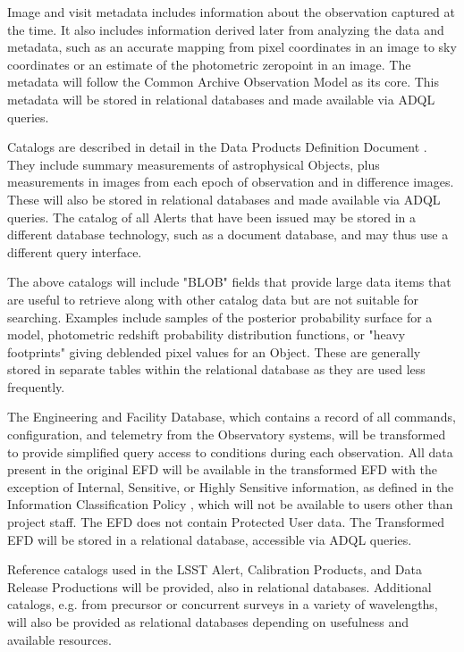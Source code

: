 Image and visit metadata includes information about the observation captured at
the time.  It also includes information derived later from analyzing the data
and metadata, such as an accurate mapping from pixel coordinates in an image to
sky coordinates or an estimate of the photometric zeropoint in an image.  The
metadata will follow the Common Archive Observation Model \citep{2012ASPC..461..339D,CAOM2} as its
core.  This metadata will be stored in relational databases and made available
via ADQL queries.

Catalogs are described in detail in the Data Products Definition Document
.  They include summary measurements of astrophysical Objects,
plus measurements in images from each epoch of observation and in difference
images.  These will also be stored in relational databases and made available
via ADQL queries.  The catalog of all Alerts that have been issued may be
stored in a different database technology, such as a document database, and
may thus use a different query interface.

The above catalogs will include "BLOB" fields that provide large data items
that are useful to retrieve along with other catalog data but are not
suitable for searching.  Examples include samples of the posterior probability
surface for a model, photometric redshift probability distribution functions,
or "heavy footprints" giving deblended pixel values for an Object.  These
are generally stored in separate tables within the relational database as
they are used less frequently.

The Engineering and Facility Database, which contains a record of all commands,
configuration, and telemetry from the Observatory systems, will be transformed
to provide simplified query access to conditions during each observation.  All
data present in the original EFD will be available in the transformed EFD with
the exception of Internal, Sensitive, or Highly Sensitive information, as
defined in the Information Classification Policy , which will
not be available to users other than project staff.  The EFD does not contain
Protected User data.  The Transformed EFD will be stored in a relational
database, accessible via ADQL queries.

Reference catalogs used in the LSST Alert, Calibration Products, and Data
Release Productions will be provided, also in relational databases.  Additional
catalogs, e.g. from precursor or concurrent surveys in a variety of
wavelengths, will also be provided as relational databases depending on
usefulness and available resources.

